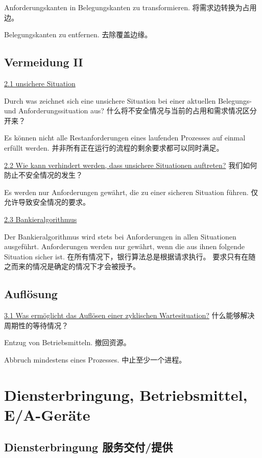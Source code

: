 \documentclass[fleqn]{article}
\begin{document}
Anforderungskanten in Belegungskanten zu transformieren.
将需求边转换为占用边。

Belegungskanten zu entfernen.
去除覆盖边缘。


\subsection{Vermeidung II}

\noindent\uline{2.1 unsichere Situation}

Durch was zeichnet sich eine unsichere Situation bei einer aktuellen Belegungs- und Anforderungssituation aus?
什么将不安全情况与当前的占用和需求情况区分开来？

Es können nicht alle Restanforderungen eines laufenden Prozesses auf einmal erfüllt werden.
并非所有正在运行的流程的剩余要求都可以同时满足。

\noindent\uline{2.2 Wie kann verhindert werden, dass unsichere Situationen auftreten?}
我们如何防止不安全情况的发生？

Es werden nur Anforderungen gewährt, die zu einer sicheren Situation führen.
仅允许导致安全情况的要求。

\noindent\uline{2.3 Bankieralgorithmus}

Der Bankieralgorithmus wird stets bei Anforderungen in allen Situationen ausgeführt. Anforderungen werden nur gewährt, wenn die aus ihnen folgende Situation sicher ist.
在所有情况下，银行算法总是根据请求执行。 要求只有在随之而来的情况是确定的情况下才会被授予。


\subsection{Auflösung}

\noindent\uline{3.1 Was ermöglicht das Auflösen einer zyklischen Wartesituation?}
什么能够解决周期性的等待情况？

Entzug von Betriebsmitteln.
撤回资源。

Abbruch mindestens eines Prozesses.
中止至少一个进程。



\section{Diensterbringung, Betriebsmittel, E/A-Geräte}

\subsection{Diensterbringung 服务交付/提供}
\end{document}

